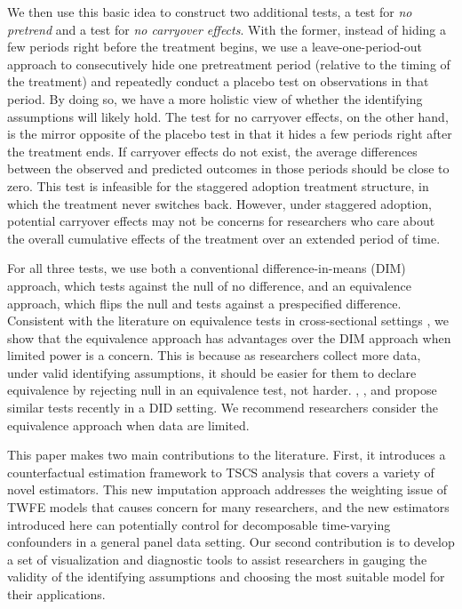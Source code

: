 \documentclass[12pt]{article}
\begin{document}
We then use this basic idea to construct two additional tests, a test for \emph{no pretrend} and a test for \emph{no carryover effects}. With the former, instead of hiding a few periods right before the treatment begins, we use a leave-one-period-out approach to consecutively hide one pretreatment period (relative to the timing of the treatment) and repeatedly conduct a placebo test on observations in that period. By doing so, we have a more holistic view of whether the identifying assumptions will likely hold. The test for no carryover effects, on the other hand, is the mirror opposite of the placebo test in that it hides a few periods right after the treatment ends. If carryover effects do not exist, the average differences between the observed and predicted outcomes in those periods should be close to zero. This test is infeasible for the staggered adoption treatment structure, in which the treatment never switches back. However, under staggered adoption, potential carryover effects may not be concerns for researchers who care about the overall cumulative effects of the treatment over an extended period of time.  

For all three tests, we use both a conventional difference-in-means (DIM) approach, which tests against the null of no difference, and an equivalence approach, which flips the null and tests against a prespecified difference. Consistent with the literature on equivalence tests in cross-sectional settings \citep{hartman2018equivalence,Hartman2020-jb}, we show that the equivalence approach has advantages over the DIM approach when limited power is a concern. This is because as researchers collect more data, under valid identifying assumptions, it should be easier for them to declare equivalence by rejecting null in an equivalence test, not harder. \citet{Bilinski2018-eh}, \citet{Dette2020-hg}, and \citet{Egami2020} propose similar tests recently in a DID setting. We recommend researchers consider the equivalence approach when data are limited. 

This paper makes two main contributions to the literature. First, it introduces a counterfactual estimation framework to TSCS analysis that covers a variety of novel estimators. This new imputation approach addresses the weighting issue of TWFE models that causes concern for many researchers, and the new estimators introduced here can potentially control for decomposable time-varying confounders in a general panel data setting. Our second contribution is to develop a set of visualization and diagnostic tools to assist researchers in gauging the validity of the identifying assumptions and choosing the most suitable model for their applications. 
\end{document}
